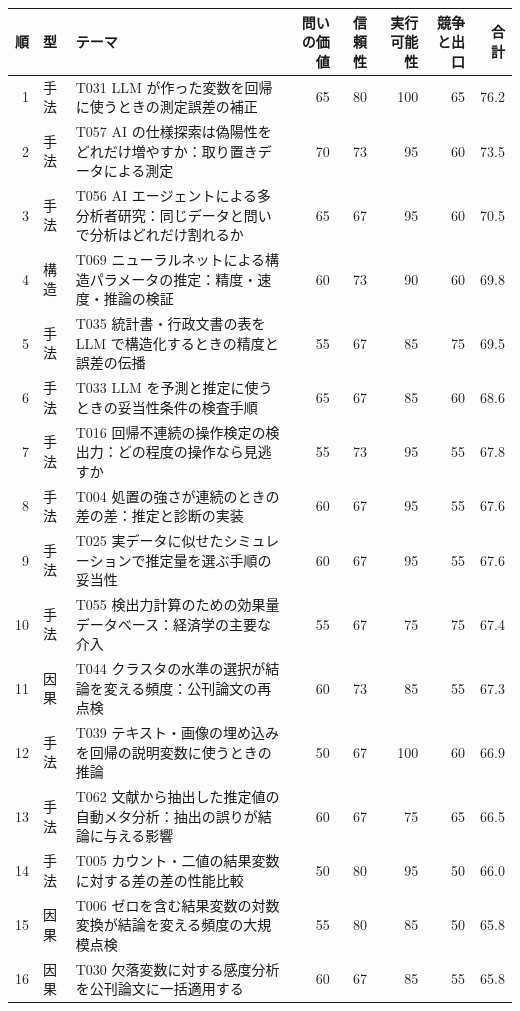 \begin{table}[htbp]
\centering\small
\begin{tabularx}{\linewidth}{rlXrrrrr}
\toprule
順 & 型 & テーマ & 問いの価値 & 信頼性 & 実行可能性 & 競争と出口 & 合計 \\
\midrule
1 & 手法 & T031 LLM が作った変数を回帰に使うときの測定誤差の補正 & 65 & 80 & 100 & 65 & 76.2 \\
2 & 手法 & T057 AI の仕様探索は偽陽性をどれだけ増やすか：取り置きデータによる測定 & 70 & 73 & 95 & 60 & 73.5 \\
3 & 手法 & T056 AI エージェントによる多分析者研究：同じデータと問いで分析はどれだけ割れるか & 65 & 67 & 95 & 60 & 70.5 \\
4 & 構造 & T069 ニューラルネットによる構造パラメータの推定：精度・速度・推論の検証 & 60 & 73 & 90 & 60 & 69.8 \\
5 & 手法 & T035 統計書・行政文書の表を LLM で構造化するときの精度と誤差の伝播 & 55 & 67 & 85 & 75 & 69.5 \\
6 & 手法 & T033 LLM を予測と推定に使うときの妥当性条件の検査手順 & 65 & 67 & 85 & 60 & 68.6 \\
7 & 手法 & T016 回帰不連続の操作検定の検出力：どの程度の操作なら見逃すか & 55 & 73 & 95 & 55 & 67.8 \\
8 & 手法 & T004 処置の強さが連続のときの差の差：推定と診断の実装 & 60 & 67 & 95 & 55 & 67.6 \\
9 & 手法 & T025 実データに似せたシミュレーションで推定量を選ぶ手順の妥当性 & 60 & 67 & 95 & 55 & 67.6 \\
10 & 手法 & T055 検出力計算のための効果量データベース：経済学の主要な介入 & 55 & 67 & 75 & 75 & 67.4 \\
11 & 因果 & T044 クラスタの水準の選択が結論を変える頻度：公刊論文の再点検 & 60 & 73 & 85 & 55 & 67.3 \\
12 & 手法 & T039 テキスト・画像の埋め込みを回帰の説明変数に使うときの推論 & 50 & 67 & 100 & 60 & 66.9 \\
13 & 手法 & T062 文献から抽出した推定値の自動メタ分析：抽出の誤りが結論に与える影響 & 60 & 67 & 75 & 65 & 66.5 \\
14 & 手法 & T005 カウント・二値の結果変数に対する差の差の性能比較 & 50 & 80 & 95 & 50 & 66.0 \\
15 & 因果 & T006 ゼロを含む結果変数の対数変換が結論を変える頻度の大規模点検 & 55 & 80 & 85 & 50 & 65.8 \\
16 & 因果 & T030 欠落変数に対する感度分析を公刊論文に一括適用する & 60 & 67 & 85 & 55 & 65.8 \\

\end{tabularx}
\end{table}
